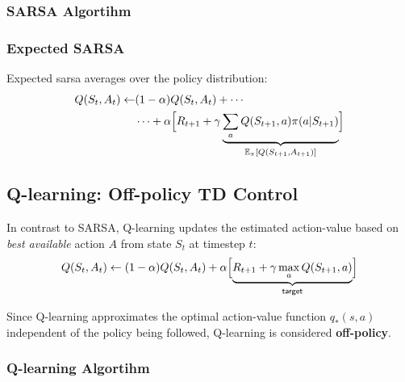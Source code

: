 \subsubsection{SARSA Algortihm}
\begin{algorithmic}
    \EndWhile{}
    \EndFor{}
\end{algorithmic}

\subsubsection{Expected SARSA}
Expected sarsa averages over the policy distribution:
\noindent\begin{align*}
    Q(S_t, A_t) \gets & (1-\alpha)Q(S_t, A_t) + \cdots                                                                                                                       \\
                      & \cdots + \alpha \Bigl[R_{t+1} + \gamma \underbrace{\sum_{a} Q(S_{t+1}, a) \pi(a| S_{t+1})}_{\mathbb{E}_\pi \left[ Q(S_{t+1}, A_{t+1})\right]} \Bigr]
\end{align*}

\subsection{Q-learning: Off-policy TD Control}
In contrast to SARSA, Q-learning updates the estimated action-value based on \textit{best available} action $A$ from state $S_t$ at timestep $t$:
\noindent\begin{equation*}
    Q(S_t, A_t) \gets (1-\alpha)Q(S_t, A_t) + \alpha \Bigl[\underbrace{R_{t+1} + \gamma \max_a Q(S_{t+1}, a)}_{\textsf{target}} \Bigr]
\end{equation*}

Since Q-learning approximates the optimal action-value function $q_*(s,a)$ independent of the policy being followed, Q-learning is considered \textbf{off-policy}.
\subsubsection{Q-learning Algortihm}
\begin{algorithmic}
    \EndWhile{}
    \EndFor{}
\end{algorithmic}